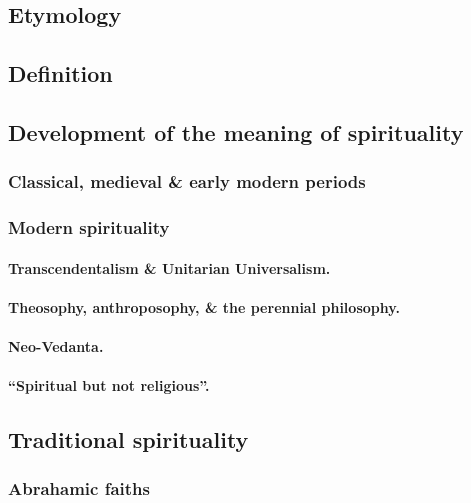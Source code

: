 \documentclass[oneside]{book}
\numberwithin{equation}{section}
\begin{document}
\subsection{Etymology}

\subsection{Definition}

\subsection{Development of the meaning of spirituality}

\subsubsection{Classical, medieval \& early modern periods}

\subsubsection{Modern spirituality}

\paragraph{Transcendentalism \& Unitarian Universalism.}

\paragraph{Theosophy, anthroposophy, \& the perennial philosophy.}

\paragraph{Neo-Vedanta.}

\paragraph{``Spiritual but not religious''.}

\subsection{Traditional spirituality}

\subsubsection{Abrahamic faiths}
\end{document}
